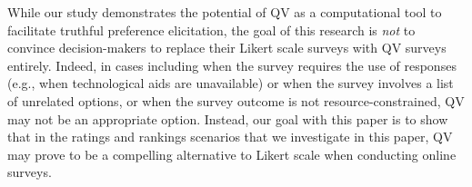 While our study demonstrates the potential of QV as a computational tool to facilitate truthful preference elicitation, the goal of this research is \textit{not} to convince decision-makers to replace their Likert scale surveys with QV surveys entirely. Indeed, in cases including when the survey requires the use of  responses (e.g., when technological aids are unavailable) or when the survey involves a list of unrelated options, or when the survey outcome is not resource-constrained,  QV may not be an appropriate option. Instead, our goal with this paper is to show that in the ratings and rankings scenarios that we investigate in this paper, QV may prove to be a compelling alternative to  Likert scale when conducting online surveys.  











